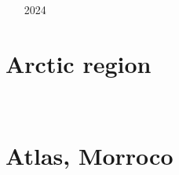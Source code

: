 \begin{small}
\begin{itemize}
\item[\nineteenninetyeight]
\item[\twothousandseven]
\item[\twothousandten]
\item[\twothousandtwelve]
 \\ 
\item[\twothousandthirteen]
 \\
\item[\twothousandfifteen]
\item[\twothousandeighteen]
\item[\twothousandtwentyone]
\item[\twothousandtwentythree]
\item[2024]
\end{itemize}
\end{small}

\section{Arctic region}

\begin{small}
\begin{itemize}
\item[\twothousandtwentyone] 
\item[\twothousandtwentyfour] 
\\
\end{itemize}
\end{small}

\section{Atlas, Morroco}

\begin{small}
\begin{itemize}
\item[\twothousandtwelve]
\item[\twothousandfourteen]
\item[\twothousandtwentythree]
\end{itemize}
\end{small}

